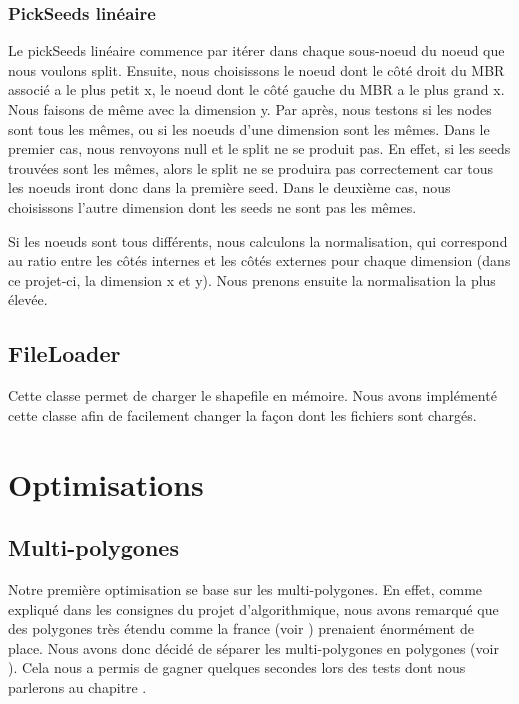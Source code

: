 \documentclass[utf8]{article}
\begin{document}
\begin{large}
  \subsubsection{PickSeeds linéaire}\label{PickSeeds lineaire}
  \indent
  \par
  Le pickSeeds linéaire commence par itérer dans chaque sous-noeud du noeud
  que nous voulons split. Ensuite, nous choisissons le noeud dont le côté droit du MBR
  associé a le plus petit x, le noeud dont le côté gauche du MBR a le plus grand
  x. Nous faisons de même avec la dimension y. Par après, nous testons si les
  nodes sont tous les mêmes, ou si les noeuds d'une dimension sont les mêmes.
  Dans le premier cas, nous renvoyons null et le split ne se produit pas. En
  effet, si les seeds trouvées sont les mêmes, alors le split ne se produira pas
  correctement car tous les noeuds iront donc dans la première seed. Dans le
  deuxième cas, nous choisissons l'autre dimension dont les seeds ne sont pas
  les mêmes.
  \par
  \indent
  \par
  Si les noeuds sont tous différents, nous calculons la normalisation, qui
  correspond au ratio entre les côtés internes et les côtés externes pour chaque
  dimension (dans ce projet-ci, la dimension x et y). Nous prenons ensuite la
  normalisation la plus élevée.
  \par

  \subsection{FileLoader}
  \indent
  \par
  Cette classe permet de charger le shapefile en mémoire. Nous avons implémenté
  cette classe afin de facilement changer la façon dont les fichiers sont chargés.


  \section{Optimisations}
  \subsection{Multi-polygones}
  \indent
  \par
  Notre première optimisation se base sur les multi-polygones. En effet, comme
  expliqué dans les consignes du projet d'algorithmique, nous avons remarqué que
  des polygones très étendu comme la france (voir )
  prenaient énormément de place. Nous avons donc décidé de séparer les
  multi-polygones en polygones (voir ). Cela nous a
  permis de gagner quelques secondes lors des tests dont nous parlerons au
  chapitre .


\end{large}
\end{document}
